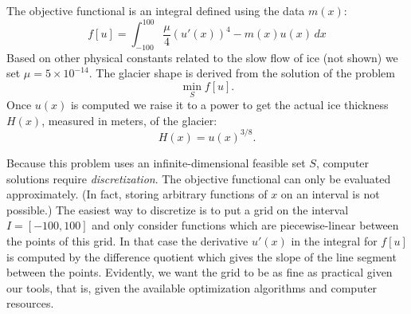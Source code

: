 \documentclass[11pt]{amsart}
\begin{document}
\begin{enumerate}
The objective functional is an integral defined using the data $m(x)$:
    $$f[u] = \int_{-100}^{100} \frac{\mu}{4} \left(u'(x)\right)^4 - m(x) u(x)\,dx$$
Based on other physical constants related to the slow flow of ice (not shown) we set $\mu = 5 \times 10^{-14}$.  The glacier shape is derived from the solution of the problem
    $$\min_S f[u].$$
Once $u(x)$ is computed we raise it to a power to get the actual ice thickness $H(x)$, measured in meters, of the glacier:
    $$H(x) = u(x)^{3/8}.$$  %

Because this problem uses an infinite-dimensional feasible set $S$, computer solutions require \emph{discretization}.  The objective functional can only be evaluated approximately.  (In fact, storing arbitrary functions of $x$ on an interval is not possible.)  The easiest way to discretize is to put a grid on the interval $I=[-100,100]$ and only consider functions which are piecewise-linear between the points of this grid.  In that case the derivative $u'(x)$ in the integral for $f[u]$ is computed by the difference quotient which gives the slope of the line segment between the points.  Evidently, we want the grid to be as fine as practical given our tools, that is, given the available optimization algorithms and computer resources.

\end{enumerate}
\end{document}
